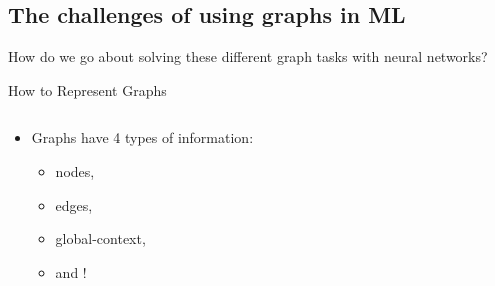\documentclass[
    11pt, %
    aspectratio=169, %
]{beamer}
\begin{document}
\subsection{The challenges of using graphs in ML}
\begin{frame}{}
    \centering
    \Large
    How do we go about solving these different graph tasks with neural networks?
\end{frame}

\begin{frame}{How to Represent Graphs}
    \begin{columns}
        \begin{column}{.5\textwidth}
            \begin{itemize}
                \item[] Graphs have 4 types of information:
                \begin{itemize}
                    \item nodes,
                    \item edges,
                    \item global-context,
                    \item and !
                \end{itemize}
            \end{itemize}
        \end{column}    

        
        \begin{column}{.5\textwidth}
        \end{column}
    \end{columns}
\end{frame}
\end{document}
